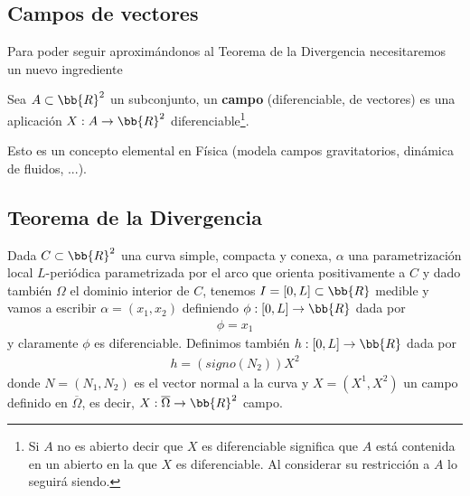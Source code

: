 \subsection{Campos de vectores}

Para poder seguir aproximándonos al Teorema de la Divergencia necesitaremos un nuevo ingrediente
\begin{definicion}
    Sea $A\subset \bb{R}^2$ un subconjunto, un \textbf{campo} (diferenciable, de vectores) es una aplicación $X:A \to \bb{R}^2$ diferenciable\footnote{Si $A$ no es abierto decir que $X$ es diferenciable significa que $A$ está contenida en un abierto en la que $X$ es diferenciable. Al considerar su restricción a $A$ lo seguirá siendo.}.
    
    \begin{figure}[H]
        \centering
    \end{figure}
\end{definicion}
Esto es un concepto elemental en Física (modela campos gravitatorios, dinámica de fluidos, ...).

\subsection{Teorema de la Divergencia}

Dada $C\subset \bb{R}^2$ una curva simple, compacta y conexa, $\alpha$ una parametrización local $L$-periódica parametrizada por el arco que orienta positivamente a $C$ y dado también $\Omega$ el dominio interior de $C$, tenemos $I=[0,L]\subset \bb{R}$ medible y vamos a escribir $\alpha=(x_1, x_2)$ definiendo $\phi: [0,L]\to \bb{R}$ dada por
\begin{gather*}
    \phi = x_1
\end{gather*}
y claramente $\phi$ es diferenciable. Definimos también $h:[0,L]\to \bb{R}$ dada por
\begin{gather*}
    h = (signo(N_2))X^2
\end{gather*}
donde $N = (N_1, N_2)$ es el vector normal a la curva y $X=(X^1, X^2)$ un campo definido en $\overline{\Omega}$, es decir, $X: \overline{\Omega} \to \bb{R}^2$ campo. \\

